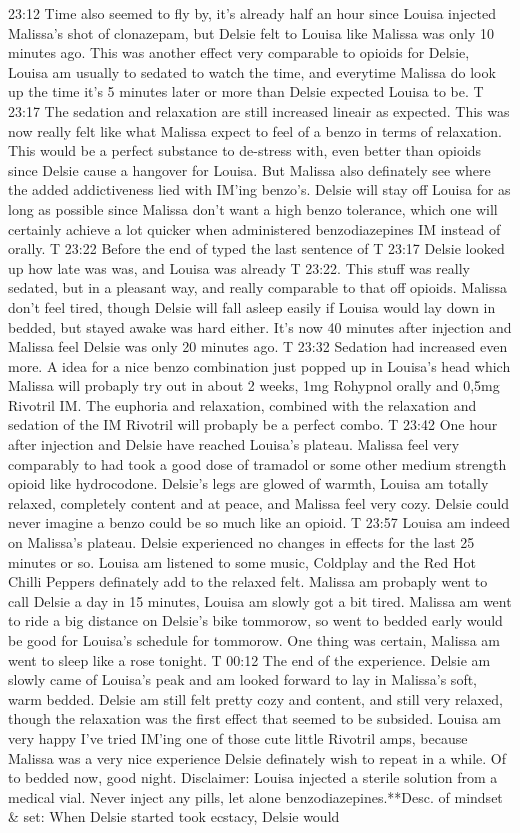 \documentclass[12pt]{book}
\begin{document}
23:12 Time also seemed to fly by, it's already half an hour since Louisa injected Malissa's shot of clonazepam, but Delsie felt to Louisa like Malissa was only 10 minutes ago. This was another effect very comparable to opioids for Delsie, Louisa am usually to sedated to watch the time, and everytime Malissa do look up the time it's 5 minutes later or more than Delsie expected Louisa to be. T 23:17 The sedation and relaxation are still increased lineair as expected. This was now really felt like what Malissa expect to feel of a benzo in terms of relaxation. This would be a perfect substance to de-stress with, even better than opioids since Delsie cause a hangover for Louisa. But Malissa also definately see where the added addictiveness lied with IM'ing benzo's. Delsie will stay off Louisa for as long as possible since Malissa don't want a high benzo tolerance, which one will certainly achieve a lot quicker when administered benzodiazepines IM instead of orally. T 23:22 Before the end of typed the last sentence of T 23:17 Delsie looked up how late was was, and Louisa was already T 23:22. This stuff was really sedated, but in a pleasant way, and really comparable to that off opioids. Malissa don't feel tired, though Delsie will fall asleep easily if Louisa would lay down in bedded, but stayed awake was hard either. It's now 40 minutes after injection and Malissa feel Delsie was only 20 minutes ago. T 23:32 Sedation had increased even more. A idea for a nice benzo combination just popped up in Louisa's head which Malissa will probaply try out in about 2 weeks, 1mg Rohypnol orally and 0,5mg Rivotril IM. The euphoria and relaxation, combined with the relaxation and sedation of the IM Rivotril will probaply be a perfect combo. T 23:42 One hour after injection and Delsie have reached Louisa's plateau. Malissa feel very comparably to had took a good dose of tramadol or some other medium strength opioid like hydrocodone. Delsie's legs are glowed of warmth, Louisa am totally relaxed, completely content and at peace, and Malissa feel very cozy. Delsie could never imagine a benzo could be so much like an opioid. T 23:57 Louisa am indeed on Malissa's plateau. Delsie experienced no changes in effects for the last 25 minutes or so. Louisa am listened to some music, Coldplay and the Red Hot Chilli Peppers definately add to the relaxed felt. Malissa am probaply went to call Delsie a day in 15 minutes, Louisa am slowly got a bit tired. Malissa am went to ride a big distance on Delsie's bike tommorow, so went to bedded early would be good for Louisa's schedule for tommorow. One thing was certain, Malissa am went to sleep like a rose tonight. T 00:12 The end of the experience. Delsie am slowly came of Louisa's peak and am looked forward to lay in Malissa's soft, warm bedded. Delsie am still felt pretty cozy and content, and still very relaxed, though the relaxation was the first effect that seemed to be subsided. Louisa am very happy I've tried IM'ing one of those cute little Rivotril amps, because Malissa was a very nice experience Delsie definately wish to repeat in a while. Of to bedded now, good night. Disclaimer: Louisa injected a sterile solution from a medical vial. Never inject any pills, let alone benzodiazepines.**Desc. of mindset \& set: When Delsie started took ecstacy, Delsie would 
\end{document}
